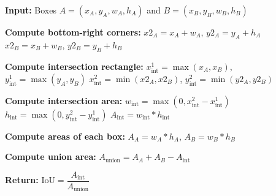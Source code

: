 \begin{algorithm}[H]
    \caption{Intersection over Union (IoU) between two bounding boxes}
    \label{alg:iou}
    \begin{algorithmic}[1]
        \State \textbf{Input:} Boxes $A = (x_A, y_A, w_A, h_A)$ and $B = (x_B, y_B, w_B, h_B)$
        
        \State \textbf{Compute bottom-right corners:}
        \Statex \hspace{\algorithmicindent} $x2_A = x_A + w_A$, \quad $y2_A = y_A + h_A$
        \Statex \hspace{\algorithmicindent} $x2_B = x_B + w_B$, \quad $y2_B = y_B + h_B$
        
        \State \textbf{Compute intersection rectangle:}
        \Statex \hspace{\algorithmicindent} $x_{\text{int}}^{1} = \max(x_A, x_B)$, \quad $y_{\text{int}}^{1} = \max(y_A, y_B)$
        \Statex \hspace{\algorithmicindent} $x_{\text{int}}^{2} = \min(x2_A, x2_B)$, \quad $y_{\text{int}}^{2} = \min(y2_A, y2_B)$

        \State \textbf{Compute intersection area:}
        \Statex \hspace{\algorithmicindent} $w_{\text{int}} = \max(0, x_{\text{int}}^{2} - x_{\text{int}}^{1})$
        \Statex \hspace{\algorithmicindent} $h_{\text{int}} = \max(0, y_{\text{int}}^{2} - y_{\text{int}}^{1})$
        \Statex \hspace{\algorithmicindent} $A_{\text{int}} = w_{\text{int}} \ast h_{\text{int}}$
        
        \State \textbf{Compute areas of each box:}
        \Statex \hspace{\algorithmicindent} $A_A = w_A \ast h_A$, \quad $A_B = w_B \ast h_B$
        
        \State \textbf{Compute union area:}
        \Statex \hspace{\algorithmicindent} $A_{\text{union}} = A_A + A_B - A_{\text{int}}$
        
        \State \textbf{Return:} $\text{IoU} = \dfrac{A_{\text{int}}}{A_{\text{union}}}$
    \end{algorithmic}
\end{algorithm}



